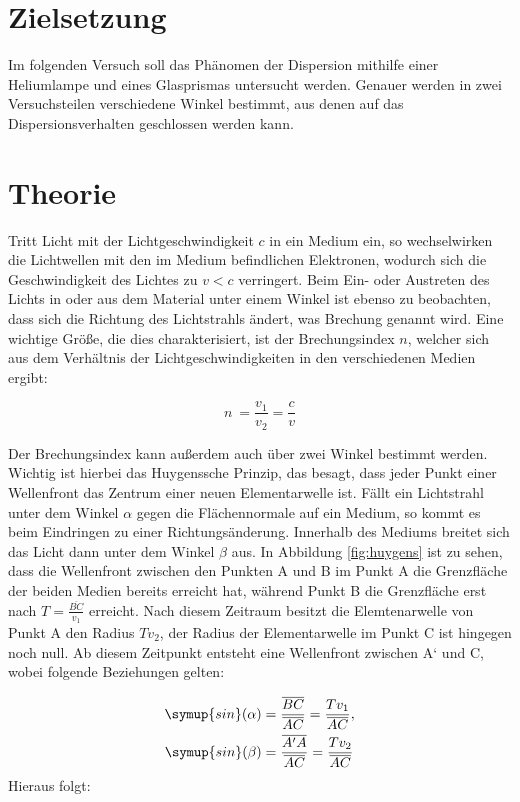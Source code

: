 \section{Zielsetzung}
Im folgenden Versuch soll das Phänomen der Dispersion mithilfe einer Heliumlampe und eines Glasprismas untersucht werden. Genauer werden in zwei Versuchsteilen verschiedene Winkel bestimmt, aus denen auf das Dispersionsverhalten geschlossen werden kann.

\section{Theorie}
Tritt Licht mit der Lichtgeschwindigkeit $c$ in ein Medium ein, so wechselwirken die Lichtwellen mit den im Medium befindlichen Elektronen, wodurch sich die Geschwindigkeit des Lichtes  zu $v < c$ verringert. Beim Ein- oder Austreten des Lichts in oder aus 
dem Material unter einem Winkel ist ebenso zu beobachten, dass sich die Richtung des Lichtstrahls ändert, was Brechung genannt wird. Eine wichtige Größe, die dies charakterisiert, ist der Brechungsindex $n$, welcher sich aus dem Verhältnis der Lichtgeschwindigkeiten 
in den verschiedenen Medien ergibt:

\begin{equation}
n \:= \frac{v_1}{v_2} = \frac{c}{v}
\end{equation}

Der Brechungsindex kann außerdem auch über zwei Winkel bestimmt werden. Wichtig ist hierbei das Huygenssche Prinzip, das besagt, dass jeder Punkt einer Wellenfront das Zentrum einer neuen Elementarwelle ist. Fällt ein Lichtstrahl unter dem Winkel $\alpha$ gegen 
die Flächennormale auf ein Medium, so kommt es beim Eindringen zu einer Richtungsänderung. Innerhalb des Mediums breitet sich das Licht dann unter dem Winkel $\beta$ aus. 
In Abbildung \ref{fig:huygens} ist zu sehen, dass die Wellenfront zwischen den Punkten A und B im  Punkt A die Grenzfläche der beiden Medien bereits erreicht hat, während Punkt B die Grenzfläche erst nach $T = \frac{\overline{BC}}{v_1}$ erreicht. Nach diesem Zeitraum besitzt die Elemtenarwelle von 
Punkt A den Radius $Tv_2$, der Radius der Elementarwelle im Punkt C ist hingegen noch null. Ab diesem Zeitpunkt entsteht eine Wellenfront zwischen A‘ und C, wobei folgende Beziehungen gelten:

\begin{equation}
\begin{aligned}
\symup{sin}(\alpha) &= \frac{\overline{BC}}{\overline{AC}} = \frac{Tv_1}{\overline{AC}}, \\
\symup{sin}(\beta) &= \frac{\overline{A'A}}{\overline{AC}} = \frac{Tv_2}{\overline{AC}} \\
\end{aligned}
\end{equation}
Hieraus folgt:

